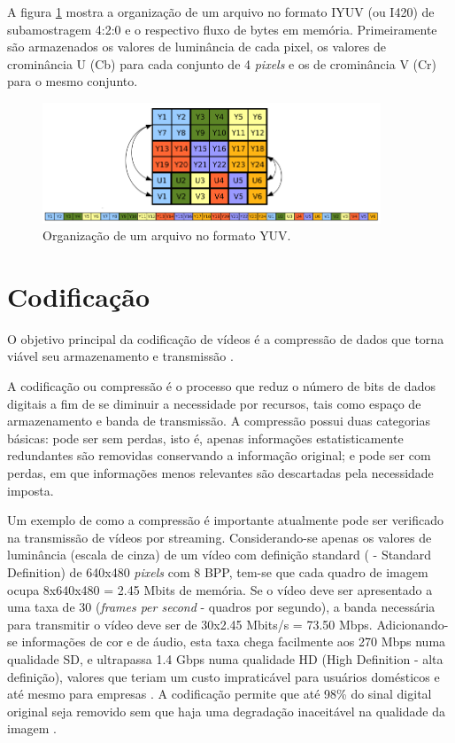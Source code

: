 A figura \ref{fig:yuvorganization} mostra a organização de um arquivo no formato IYUV (ou I420) de subamostragem 4:2:0 e o respectivo fluxo de bytes em memória. Primeiramente são armazenados os valores de luminância de cada pixel, os valores de crominância U (Cb) para cada conjunto de 4 \emph{pixels} e os de crominância V (Cr) para o mesmo conjunto.

\begin{figure}[!htb]
	\centering
	\includegraphics[width=0.9\textwidth]{./imgs/yuvorganization.png}
	\caption{Organização de um arquivo no formato YUV.}
	\label{fig:yuvorganization}
\end{figure}

\section{Codificação}

O objetivo principal da codificação de vídeos é a compressão de dados que torna viável seu armazenamento e transmissão \cite{daronco}.

A codificação ou compressão é o processo que reduz o número de bits de dados digitais a fim de se diminuir a necessidade por recursos, tais como espaço de armazenamento e banda de transmissão. A compressão possui duas categorias básicas: pode ser sem perdas, isto é, apenas informações estatisticamente redundantes são removidas conservando a informação original; e pode ser com perdas, em que informações menos relevantes são descartadas pela necessidade imposta.

Um exemplo de como a compressão é importante atualmente pode ser verificado na transmissão de vídeos por streaming. Considerando-se apenas os valores de luminância (escala de cinza) de um vídeo com definição standard ( - Standard Definition) de 640x480 \emph{pixels} com 8 BPP, tem-se que cada quadro de imagem ocupa 8x640x480 = 2.45 Mbits de memória. Se o vídeo deve ser apresentado a uma taxa de 30  (\emph{frames per second} - quadros por segundo), a banda necessária para transmitir o vídeo deve ser de 30x2.45 Mbits/s = 73.50 Mbps. Adicionando-se informações de cor e de áudio, esta taxa chega facilmente aos 270 Mbps numa qualidade SD, e ultrapassa 1.4 Gbps numa qualidade HD (High Definition - alta definição), valores que teriam um custo impraticável para usuários domésticos e até mesmo para empresas \cite{ciscoieee}. A codificação permite que até 98\% do sinal digital original seja removido sem que haja uma degradação inaceitável na qualidade da imagem \cite{mpeg2ref}.

